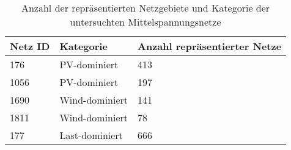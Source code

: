 {
\renewcommand{\arraystretch}{1.2}%
\begin{table}[H]
	\begin{center}
		\caption{Anzahl der repräsentierten Netzgebiete und Kategorie der untersuchten Mittelspannungsnetze}
		\begin{tabu} to \textwidth {X[1] X[1] X[1, r] }
			\toprule
			Netz ID    & Kategorie      & Anzahl repräsentierter Netze \\ \midrule
			\num{176}  & PV-dominiert   & \num{413}                    \\
			\num{1056} & PV-dominiert   & \num{197}                    \\
			\num{1690} & Wind-dominiert & \num{141}                    \\
			\num{1811} & Wind-dominiert & \num{78}                     \\
			\num{177}  & Last-dominiert & \num{666}                    \\ \bottomrule
		\end{tabu}
		\label{tab:grid_IDs}
	\end{center}
	\vspace{-3mm}%
\end{table}
}